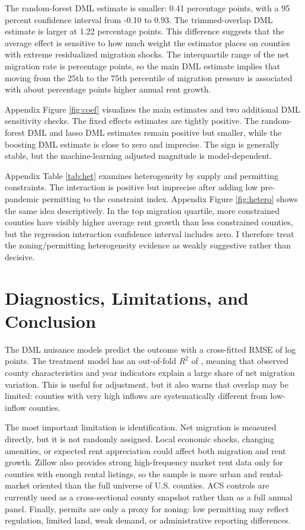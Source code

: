\documentclass[11pt]{article}
\begin{document}
The random-forest DML estimate is smaller: 0.41 percentage points, with a 95 percent confidence interval from -0.10 to 0.93. The trimmed-overlap DML estimate is larger at 1.22 percentage points. This difference suggests that the average effect is sensitive to how much weight the estimator places on counties with extreme residualized migration shocks. The interquartile range of the net migration rate is \PopGrowthIQR{} percentage points, so the main DML estimate implies that moving from the 25th to the 75th percentile of migration pressure is associated with about \DMLIqrEffect{} percentage points higher annual rent growth.

Appendix Figure \ref{fig:coef} visualizes the main estimates and two additional DML sensitivity checks. The fixed effects estimates are tightly positive. The random-forest DML and lasso DML estimates remain positive but smaller, while the boosting DML estimate is close to zero and imprecise. The sign is generally stable, but the machine-learning adjusted magnitude is model-dependent.

Appendix Table \ref{tab:het} examines heterogeneity by supply and permitting constraints. The interaction is positive but imprecise after adding low pre-pandemic permitting to the constraint index. Appendix Figure \ref{fig:hetero} shows the same idea descriptively. In the top migration quartile, more constrained counties have visibly higher average rent growth than less constrained counties, but the regression interaction confidence interval includes zero. I therefore treat the zoning/permitting heterogeneity evidence as weakly suggestive rather than decisive.

\section{Diagnostics, Limitations, and Conclusion}

The DML nuisance models predict the outcome with a cross-fitted RMSE of \OutcomeRMSE{} log points. The treatment model has an out-of-fold $R^2$ of \TreatmentRtwo{}, meaning that observed county characteristics and year indicators explain a large share of net migration variation. This is useful for adjustment, but it also warns that overlap may be limited: counties with very high inflows are systematically different from low-inflow counties.

The most important limitation is identification. Net migration is measured directly, but it is not randomly assigned. Local economic shocks, changing amenities, or expected rent appreciation could affect both migration and rent growth. Zillow also provides strong high-frequency market rent data only for counties with enough rental listings, so the sample is more urban and rental-market oriented than the full universe of U.S. counties. ACS controls are currently used as a cross-sectional county snapshot rather than as a full annual panel. Finally, permits are only a proxy for zoning: low permitting may reflect regulation, limited land, weak demand, or administrative reporting differences.
\end{document}
